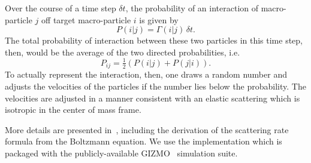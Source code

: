 Over the course of a time step \(\delta t\), the probability of an
interaction of macro-particle \(j\) off target macro-particle \(i\) is
given by 
\begin{equation}
P(i|j) = \Gamma(i|j) \, \delta t.
\end{equation}
The total probability
of interaction between these two particles in this time step, then,
would be the average of the two directed probabilities, i.e.
\begin{equation}
P_{ij} = \tfrac{1}{2} \left( P(i|j) + P(j|i) \right).
\end{equation}
To actually
represent the interaction, then, one draws a random number and adjusts
the velocities of the particles if the number lies below the
probability. The velocities are adjusted in a manner consistent with an
elastic scattering which is isotropic in the center of mass frame.

More details are presented in~\cite{rocha_cosmological_2013}, including the
derivation of the scattering rate formula from the Boltzmann equation. We use
the implementation which is packaged with the publicly-available
GIZMO~\cite{hopkins_new_2015} simulation suite.
